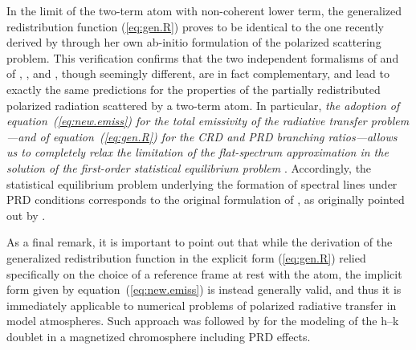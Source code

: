 \documentclass[preprint]{aastex}
\newcommand{\<}{{\kern-5pt}}
\begin{document}

In the limit of the two-term atom with non-coherent lower
term, the generalized redistribution function (\ref{eq:gen.R}) 
proves to be identical to the one recently derived by \cite{Bo17} through 
her own ab-initio formulation of the polarized scattering problem. This
verification confirms that the two independent formalisms of 
\cite{Bo97a,Bo97b,Bo16,Bo17} and of \cite{Ca14}, \cite{CM16}, and \cite{Ca17}, 
though seemingly different, are in fact complementary, and lead to exactly 
the same predictions for the properties of the partially redistributed 
polarized radiation scattered by a two-term atom.
%
In particular, \emph{the adoption of equation~(\ref{eq:new.emiss}) for 
the total emissivity of the radiative transfer problem---and of
equation~(\ref{eq:gen.R}) for the CRD and PRD branching ratios---allows us to
completely relax the limitation of the flat-spectrum approximation in
the solution of the first-order statistical equilibrium problem}
\cite[see also][]{Bo17}. Accordingly, the statistical
equilibrium problem underlying the formation of spectral lines
under PRD conditions corresponds to the original formulation of 
\cite{La83,La84}, as originally pointed out by
\cite{Bo97a,Bo97b}.

As a final remark, it is important to point out that while the derivation 
of the generalized redistribution function in the explicit form (\ref{eq:gen.R}) 
relied specifically on the choice of a reference frame at rest with the
atom, the implicit form given by equation~(\ref{eq:new.emiss}) is
instead generally valid, and thus it is immediately applicable to
numerical problems of polarized radiative transfer in model atmospheres. 
Such approach was followed by \cite{dPA16} for the modeling of the 
 h--k doublet in a magnetized chromosphere including PRD effects.
\end{document}
